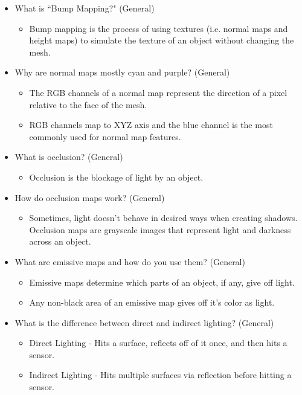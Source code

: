 \documentclass{article}
\begin{document}
\begin{itemize}
\begin{itemize}
    \end{itemize}
    \item What is ``Bump Mapping?" (General)
    \begin{itemize}
        \item Bump mapping is the process of using textures (i.e. normal maps and height maps) to simulate the texture of an object without changing the mesh.
    \end{itemize}
    \item Why are normal maps mostly cyan and purple? (General)
    \begin{itemize}
        \item The RGB channels of a normal map represent the direction of a pixel relative to the face of the mesh.
        \item RGB channels map to XYZ axis and the blue channel is the most commonly used for normal map features.
    \end{itemize}
     \item What is occlusion? (General)
    \begin{itemize}
        \item Occlusion is the blockage of light by an object.
    \end{itemize}
    \item How do occlusion maps work? (General)
    \begin{itemize}
        \item Sometimes, light doesn't behave in desired ways when creating shadows. Occlusion maps are grayscale images that represent light and darkness across an object.
    \end{itemize}
     \item What are emissive maps and how do you use them? (General)
    \begin{itemize}
        \item Emissive maps determine which parts of an object, if any, give off light.
        \item Any non-black area of an emissive map gives off it's color as light.
    \end{itemize}
    \item What is the difference between direct and indirect lighting? (General)
    \begin{itemize}
        \item Direct Lighting - Hits a surface, reflects off of it once, and then hits a sensor.
        \item Indirect Lighting - Hits multiple surfaces via reflection before hitting a sensor.

\end{itemize}
\end{itemize}
\end{document}
